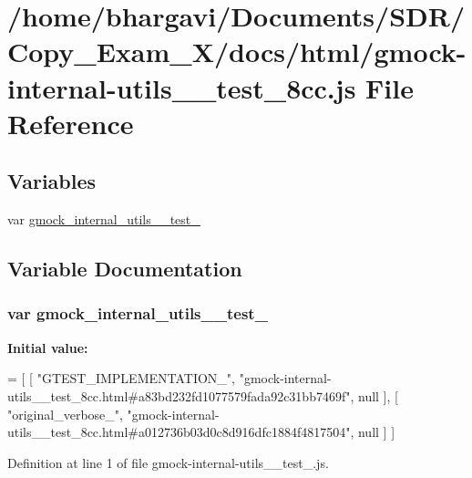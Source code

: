 \hypertarget{gmock-internal-utils____test__8cc_8js}{}\section{/home/bhargavi/\+Documents/\+S\+D\+R/\+Copy\+\_\+\+Exam\+\_\+X/docs/html/gmock-\/internal-\/utils\+\_\+\+\_\+test\+\_\+8cc.js File Reference}
\label{gmock-internal-utils____test__8cc_8js}
\subsection*{Variables}
\begin{DoxyCompactItemize}
\item 
var \hyperlink{gmock-internal-utils____test__8cc_8js_a285f9849bdc143a7b95abdcfa648ab82}{gmock\+\_\+internal\+\_\+utils\+\_\+\+\_\+test\+\_}
\end{DoxyCompactItemize}


\subsection{Variable Documentation}
\subsubsection[{\texorpdfstring{gmock\+\_\+internal\+\_\+utils\+\_\+\+\_\+test\+\_\+8cc}{gmock_internal_utils__test_8cc}}]{\setlength{\rightskip}{0pt plus 5cm}var gmock\+\_\+internal\+\_\+utils\+\_\+\+\_\+test\+\_}\hypertarget{gmock-internal-utils____test__8cc_8js_a285f9849bdc143a7b95abdcfa648ab82}{}\label{gmock-internal-utils____test__8cc_8js_a285f9849bdc143a7b95abdcfa648ab82}
{\bfseries Initial value\+:}
\begin{DoxyCode}
=
[
    [ \textcolor{stringliteral}{"GTEST\_IMPLEMENTATION\_"}, \textcolor{stringliteral}{"gmock-internal-utils\_\_test\_8cc.html#a83bd232fd1077579fada92c31bb7469f"}, 
      null ],
    [ \textcolor{stringliteral}{"original\_verbose\_"}, \textcolor{stringliteral}{"gmock-internal-utils\_\_test\_8cc.html#a012736b03d0c8d916dfc1884f4817504"}, null ]
]
\end{DoxyCode}


Definition at line 1 of file gmock-\/internal-\/utils\+\_\+\+\_\+test\+\_.\+js.

